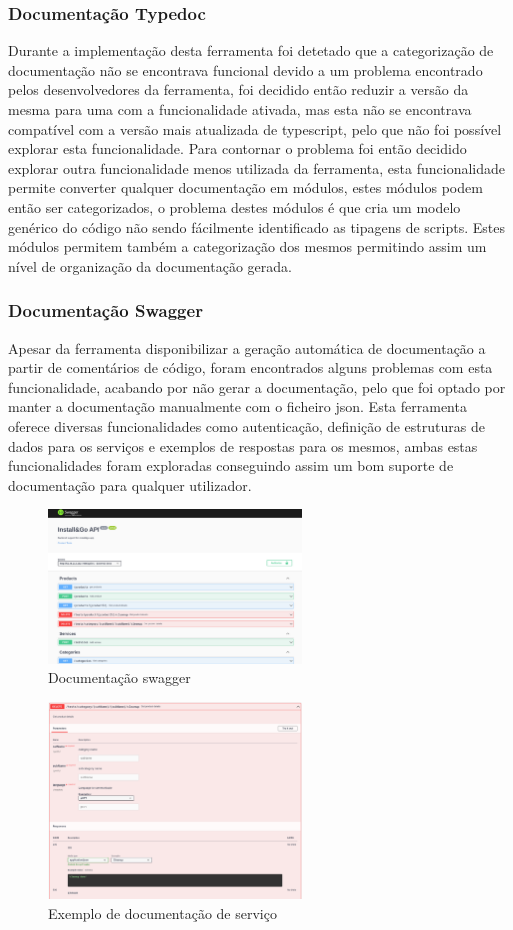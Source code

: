 \subsubsection{Documentação Typedoc}
Durante a implementação desta ferramenta foi detetado que a categorização de documentação não se encontrava funcional devido a um problema encontrado pelos desenvolvedores da ferramenta, foi decidido então reduzir a versão da mesma para uma com a funcionalidade ativada, mas esta não se encontrava compatível com a versão mais atualizada de typescript, pelo que não foi possível explorar esta funcionalidade. Para contornar o problema foi então decidido explorar outra funcionalidade menos utilizada da ferramenta, esta funcionalidade permite converter qualquer documentação em módulos, estes módulos podem então ser categorizados, o problema destes módulos é que cria um modelo genérico do código não sendo fácilmente identificado as tipagens de scripts. Estes módulos permitem também a categorização dos mesmos permitindo assim um nível de organização da documentação gerada.

\newpage

\subsubsection{Documentação Swagger}
Apesar da ferramenta disponibilizar a geração automática de documentação a partir de comentários de código, foram encontrados alguns problemas com esta funcionalidade, acabando por não gerar a documentação, pelo que foi optado por manter a documentação manualmente com o ficheiro json. Esta ferramenta oferece diversas funcionalidades como autenticação, definição de estruturas de dados para os serviços e exemplos de respostas para os mesmos, ambas estas funcionalidades foram exploradas conseguindo assim um bom suporte de documentação para qualquer utilizador.

\begin{figure}[htb]
  \centering
  \includegraphics[width=0.6\textwidth]{images/implementacao/api/swagger_intro.png}
  \caption{Documentação swagger}
  \label{fig:67}
\end{figure}

\begin{figure}[htb]
  \centering
  \includegraphics[width=0.6\textwidth]{images/implementacao/api/swagger_pedido.png}
  \caption{Exemplo de documentação de serviço}
  \label{fig:68}
\end{figure}